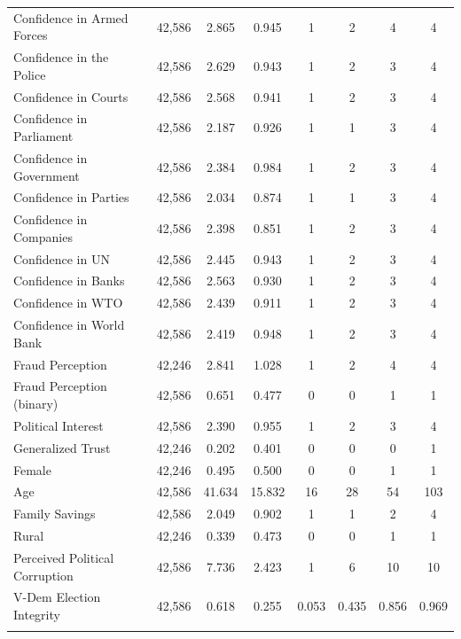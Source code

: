 \documentclass[11pt, ngerman,english,a4]{article}
\begin{document}
\begin{table}[!htbp]
\begin{tabular}{@{\extracolsep{5pt}}lccccccc}
Confidence in Armed Forces & 42,586 & 2.865 & 0.945 & 1 & 2 & 4 & 4 \\ 
Confidence in the Police & 42,586 & 2.629 & 0.943 & 1 & 2 & 3 & 4 \\ 
Confidence in Courts & 42,586 & 2.568 & 0.941 & 1 & 2 & 3 & 4 \\ 
Confidence in Parliament & 42,586 & 2.187 & 0.926 & 1 & 1 & 3 & 4 \\ 
Confidence in Government & 42,586 & 2.384 & 0.984 & 1 & 2 & 3 & 4 \\ 
Confidence in Parties & 42,586 & 2.034 & 0.874 & 1 & 1 & 3 & 4 \\ 
Confidence in Companies & 42,586 & 2.398 & 0.851 & 1 & 2 & 3 & 4 \\ 
Confidence in UN & 42,586 & 2.445 & 0.943 & 1 & 2 & 3 & 4 \\ 
Confidence in Banks & 42,586 & 2.563 & 0.930 & 1 & 2 & 3 & 4 \\ 
Confidence in WTO & 42,586 & 2.439 & 0.911 & 1 & 2 & 3 & 4 \\ 
Confidence in World Bank & 42,586 & 2.419 & 0.948 & 1 & 2 & 3 & 4 \\ 
Fraud Perception & 42,246 & 2.841 & 1.028 & 1 & 2 & 4 & 4 \\ 
Fraud Perception (binary) & 42,586 & 0.651 & 0.477 & 0 & 0 & 1 & 1 \\ 
Political Interest  & 42,586 & 2.390 & 0.955 & 1 & 2 & 3 & 4 \\ 
Generalized Trust  & 42,246 & 0.202 & 0.401 & 0 & 0 & 0 & 1 \\ 
Female & 42,246 & 0.495 & 0.500 & 0 & 0 & 1 & 1 \\ 
Age & 42,586 & 41.634 & 15.832 & 16 & 28 & 54 & 103 \\ 
Family Savings & 42,586 & 2.049 & 0.902 & 1 & 1 & 2 & 4 \\ 
Rural & 42,246 & 0.339 & 0.473 & 0 & 0 & 1 & 1 \\ 
Perceived Political Corruption & 42,586 & 7.736 & 2.423 & 1 & 6 & 10 & 10 \\ 
V-Dem Election Integrity & 42,586 & 0.618 & 0.255 & 0.053 & 0.435 & 0.856 & 0.969 \\ 
\hline \\[-1.8ex] 
\end{tabular} 
\end{table} 
\end{document}
